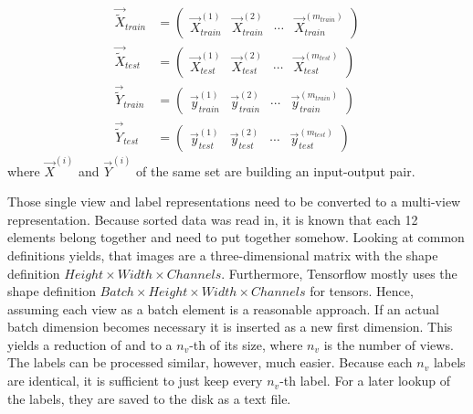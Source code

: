 \begin{subequations}
	\begin{align}
		\label{eq:list-x-train}
		\vec{\tilde{X}}_{train} &=
		\begin{pmatrix}
			\vec{X}_{train}^{(1)} & \vec{X}_{train}^{(2)} & \cdots & \vec{X}_{train}^{(m_{train})}
		\end{pmatrix}
		\\
		\label{eq:list-x-test}
		\vec{\tilde{X}}_{test} &=
		\begin{pmatrix}
			\vec{X}_{test}^{(1)} & \vec{X}_{test}^{(2)} & \cdots & \vec{X}_{test}^{(m_{test})}
		\end{pmatrix}
		\\
		\label{eq:list-y-train}
		\vec{\tilde{Y}}_{train} &=
		\begin{pmatrix}
			\vec{y}_{train}^{(1)} & \vec{y}_{train}^{(2)} & \cdots & \vec{y}_{train}^{(m_{train})}
		\end{pmatrix}
		\\
		\label{eq:list-y-test}
		\vec{\tilde{Y}}_{test} &=
		\begin{pmatrix}
			\vec{y}_{test}^{(1)} & \vec{y}_{test}^{(2)} & \cdots & \vec{y}_{test}^{(m_{test})}
		\end{pmatrix}
	\end{align}
\end{subequations}
where $\vec{X}^{(i)}$ and $\vec{Y}^{(i)}$ of the same set are building an input-output pair.

Those single view and label representations need to be converted to a multi-view representation.
Because sorted data was read in, it is known that each 12 elements belong together and need to put together somehow.
Looking at common definitions yields, that images are a three-dimensional matrix with the shape definition $Height \times Width \times Channels$.
Furthermore, Tensorflow mostly uses the shape definition $Batch \times Height \times Width \times Channels$ for tensors.
Hence, assuming each view as a batch element is a reasonable approach.
If an actual batch dimension becomes necessary it is inserted as a new first dimension.
This yields a reduction of  and  to a $n_v$-th of its size, where $n_v$ is the number of views.
The labels can be processed similar, however, much easier.
Because each $n_v$ labels are identical, it is sufficient to just keep every $n_v$-th label.
For a later lookup of the labels, they are saved to the disk as a text file.